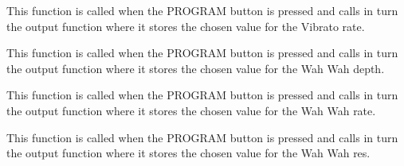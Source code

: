 \documentclass[letterpaper,10pt,english]{sphinxmanual}
\begin{document}

\begin{fulllineitems}
\label{Code:GUI.set_vibratoRate}
This function is called when the PROGRAM button is pressed and calls in turn the output function where it stores the chosen 
value for the Vibrato rate.

\end{fulllineitems}


\begin{fulllineitems}
\label{Code:GUI.set_wahwahDepth}
This function is called when the PROGRAM button is pressed and calls in turn the output function where it stores the chosen 
value for the Wah Wah depth.

\end{fulllineitems}


\begin{fulllineitems}
\label{Code:GUI.set_wahwahRate}
This function is called when the PROGRAM button is pressed and calls in turn the output function where it stores the chosen 
value for the Wah Wah rate.

\end{fulllineitems}


\begin{fulllineitems}
\label{Code:GUI.set_wahwahRes}
This function is called when the PROGRAM button is pressed and calls in turn the output function where it stores the chosen 
value for the Wah Wah res.

\end{fulllineitems}

\end{document}
